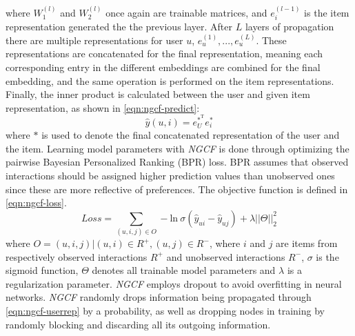 where $W_1^{(l)}$ and $W_2^{(l)}$ once again are trainable matrices, and $e_i^{(l-1)}$ is the item representation generated the the previous layer.
After $L$ layers of propagation there are multiple representations for user $u$, ${e_u^{(1)},...,e_u^{(L)}}$. These representations are concatenated for the final representation, meaning each corresponding entry in the different embeddings are combined for the final embedding, and the same operation is performed on the item representations.
Finally, the inner product is calculated between the user and given item representation, as shown in \autoref{eqn:ngcf-predict}:
\begin{equation}\label{eqn:ngcf-predict}
  \hat{y}(u, i) = e_U^{*^\textrm{T}} e_i^*
\end{equation}
where $*$ is used to denote the final concatenated representation of the user and the item.
Learning model parameters with \textit{NGCF} is done through optimizing the pairwise Bayesian Personalized Ranking (BPR) loss.
BPR assumes that observed interactions should be assigned higher prediction values than unobserved ones since these are more reflective of preferences.
The objective function is defined in \autoref{eqn:ngcf-loss}.
\begin{equation}\label{eqn:ngcf-loss}
    Loss = \sum_{(u, i, j) \in O} - \textrm{ln} \: \sigma (\hat{y}_{ui} - \hat{y}_{uj}) + \lambda ||\Theta||_2^2
\end{equation}
where $O = {(u, i, j) | (u, i) \in R^+, (u, j) \in R^-}$, where $i$ and $j$ are items from respectively observed interactions $R^+$ and unobserved interactions $R^-$, $\sigma$ is the sigmoid function, $\Theta$ denotes all trainable model parameters and $\lambda$ is a regularization parameter.
\textit{NGCF} employs dropout to avoid overfitting in neural networks.
\textit{NGCF} randomly drops information being propagated through \autoref{eqn:ngcf-userrep} by a probability, as well as dropping nodes in training by randomly blocking and discarding all its outgoing information.
